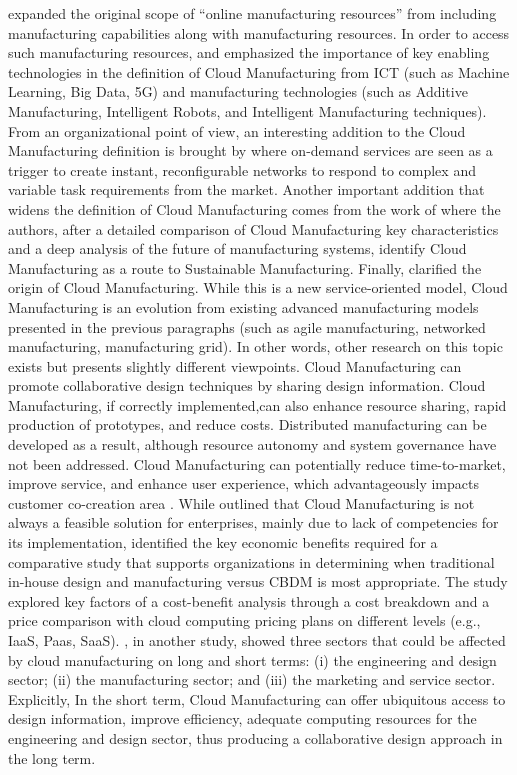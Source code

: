 \textcite{xu_cloud_2012} expanded the original scope of “online manufacturing resources” from \textcite{bo-hu_cloud_2010} including manufacturing capabilities along with manufacturing resources. In order to access such manufacturing resources, \textcite{tao_cloud_2011} and \textcite{ren_cloud_2017} emphasized the importance of key enabling technologies in the definition of Cloud Manufacturing from ICT (such as Machine Learning, Big Data, 5G) and manufacturing technologies (such as Additive Manufacturing, Intelligent Robots, and Intelligent Manufacturing techniques). From an organizational point of view, an interesting addition to the Cloud Manufacturing definition is brought by \textcite{wu_cloud_2013} where on-demand services are seen as a trigger to create instant, reconfigurable networks to respond to complex and variable task requirements from the market. Another important addition that widens the definition of Cloud Manufacturing comes from the work of \textcite{fisher_cloud_2018} where the authors, after a detailed comparison of Cloud Manufacturing key characteristics and a deep analysis of the future of manufacturing systems, identify Cloud Manufacturing as a route to Sustainable Manufacturing. Finally, \textcite{tao_cloud_2011} clarified the origin of Cloud Manufacturing. While this is a new service-oriented model, Cloud Manufacturing is an evolution from existing advanced manufacturing models presented in the previous paragraphs (such as agile manufacturing, networked manufacturing, manufacturing grid). In other words, other research on this topic exists but presents slightly different viewpoints. Cloud Manufacturing can promote collaborative design techniques by sharing design information. Cloud Manufacturing, if correctly implemented,can also enhance resource sharing, rapid production of prototypes, and reduce costs. Distributed manufacturing can be developed as a result, although resource autonomy and system governance have not been addressed. Cloud Manufacturing can potentially reduce time-to-market, improve service, and enhance user experience, which advantageously impacts customer co-creation area \parencite{wu_cloud_2013-1}. While \textcite{adamson_state_2013} outlined that Cloud Manufacturing is not always a feasible solution for enterprises, mainly due to lack of competencies for its implementation, \parencite{wu_economic_2015} identified the key economic benefits required for a comparative study that supports organizations in determining when traditional in-house design and manufacturing versus CBDM is most appropriate. The study explored key factors of a cost-benefit analysis through a cost breakdown and a price comparison with cloud computing pricing plans on different levels (e.g., IaaS, Paas, SaaS). \parencite{wu_cloud_2013-1}, in another study, showed three sectors that could be affected by cloud manufacturing on long and short terms: (i) the engineering and design sector; (ii) the manufacturing sector; and (iii) the marketing and service sector. Explicitly, In the short term, Cloud Manufacturing can offer ubiquitous access to design information, improve efficiency, adequate computing resources for the engineering and design sector, thus producing a collaborative design approach in the long term.\\
